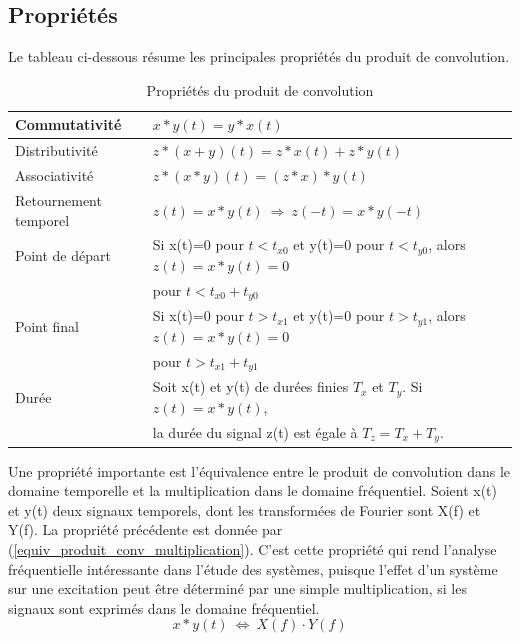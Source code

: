 	\subsection{Propriétés}
	Le tableau ci-dessous résume les principales propriétés du produit de convolution.
	
	\begin{table}[h!]
		\centering
		\caption{\label{Tab:Propriétés_convolution} Propriétés du produit de convolution}
		\begin{tabular}{|l|l|}
			\hline
			Commutativité & $x*y(t) = y*x(t) $ \\	
			\hline
			Distributivité & $z*(x+y)(t) = z*x(t)+z*y(t)$ \\	
			\hline
			Associativité & $z*(x*y)(t)=(z*x)*y(t)$ \\	
			\hline
			Retournement temporel & $z(t)=x*y(t)~\Rightarrow~z(-t)=x*y(-t)$ \\	
			\hline
			Point de départ & Si x(t)=0 pour $t<t_{x0}$ et y(t)=0 pour $t<t_{y0}$, alors $z(t)=x*y(t)=0$ \\ & pour $t<t_{x0}+t_{y0}$ \\
			\hline
			Point final & Si x(t)=0 pour $t>t_{x1}$ et y(t)=0 pour $t>t_{y1}$, alors $z(t)=x*y(t)=0$ \\ & pour $t>t_{x1}+t_{y1}$ \\
			\hline
			Durée & Soit x(t) et y(t) de durées finies $T_{x}$ et $T_{y}$. Si			 $z(t)=x*y(t)$,\\ &  la durée du signal z(t) est égale à $T_{z}=T_{x}+T_{y}$. \\
			\hline
		\end{tabular}	
	\end{table}
	
	Une propriété importante est l'équivalence entre le produit de convolution dans le domaine temporelle et la multiplication dans le domaine fréquentiel. Soient x(t) et y(t) deux signaux temporels, dont les transformées de Fourier sont X(f) et Y(f). La propriété précédente est donnée par (\ref{equiv_produit_conv_multiplication}). C'est cette propriété qui rend l'analyse fréquentielle intéressante dans l'étude des systèmes, puisque l'effet d'un système sur une excitation peut être déterminé par une simple multiplication, si les signaux sont exprimés dans le domaine fréquentiel. 
	\begin{equation}\label{equiv_produit_conv_multiplication}
	x*y(t)~\Longleftrightarrow~X(f)\cdot Y(f)
	\end{equation}
	
